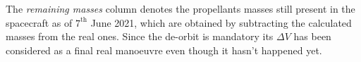 The \textit{remaining masses} column denotes the propellants masses still present in the spacecraft as of $7^{\textrm{th}}$ June 2021, which are obtained by subtracting the calculated masses from the real ones. Since the de-orbit is mandatory its $\Delta V$ has been considered as a final real manoeuvre even though it hasn't happened yet.
